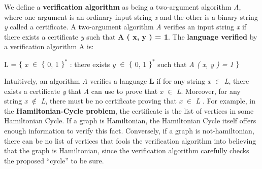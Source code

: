 We define a {\bfseries verification algorithm} as being a two-argument algorithm {\itshape A}, where one argument is an ordinary input string {\itshape x} and the other is a binary string {\itshape y} called a certificate. A two-argument algorithm {\itshape A} verifies an input string {\itshape x} if there exists a certificate {\itshape y} such that {\bfseries A ( x, y ) = 1}. The {\bfseries language verified} by a verification algorithm A is: \hfill \break

\begin{center}
L = $\lbrace$ {\itshape x} $\in$ $\lbrace$ 0, 1 $\rbrace ^{*}$ : there exists {\itshape y} $\in$ $\lbrace$ 0, 1 $\rbrace ^{*}$ such that {\itshape A ( x, y ) = 1} $\rbrace$
\end{center} \hfill \break

Intuitively, an algorithm {\itshape A} verifies a language {\bfseries L} if for any string {\itshape x} $\in$ {\itshape L}, there exists a certificate {\itshape y} that {\itshape A} can use to prove that {\itshape x} $\in$ {\itshape L}. Moreover, for any string {\itshape x} $\not \in$ {\itshape L}, there must be no certificate proving that {\itshape x} $\in$ {\itshape L} . For example, in the {\bfseries Hamiltonian-Cycle problem}, the certificate is the list of vertices in some Hamiltonian Cycle. If a graph is Hamiltonian, the Hamiltonian Cycle itself offers enough information to verify this fact. Conversely, if a graph is not-hamiltonian, there can be no list of vertices that fools the verification algorithm into believing that the graph is Hamiltonian, since the verification algorithm carefully checks the proposed “cycle” to be sure.

\pagebreak